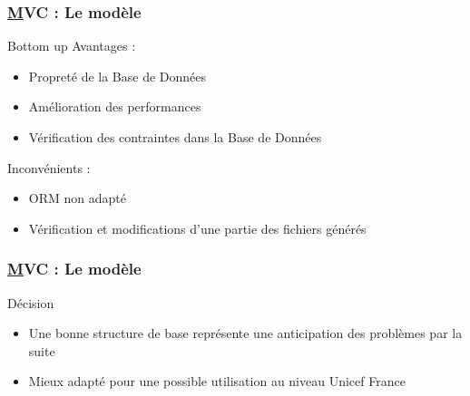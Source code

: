 
\begin{frame}
	\frametitle{\underline{M}VC : Le modèle}
	\begin{block}{Bottom up}
	Avantages :
		\begin{itemize}
			\item Propreté de la Base de Données
			\item Amélioration des performances
			\item Vérification des contraintes dans la Base de Données
		\end{itemize} 
	Inconvénients :
		\begin{itemize}
			\item ORM non adapté
			\item Vérification et modifications d'une partie des fichiers générés
		\end{itemize}
	\end{block}
  
\end{frame}


\begin{frame}
	\frametitle{\underline{M}VC : Le modèle}
	\begin{block}{Décision}
		\begin{itemize}
		\item Une bonne structure de base représente une anticipation des problèmes par la suite 
		\item Mieux adapté pour une possible utilisation au niveau Unicef France
		\end{itemize}
		
		
	\end{block}
\end{frame}
